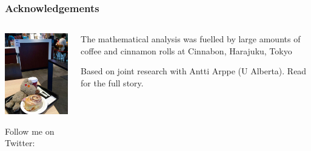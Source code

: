 \documentclass[t]{beamer} %
\begin{document}
\begin{frame}
  \frametitle{Acknowledgements}

  \ungap[1]
  \begin{columns}[T]
    \begin{column}{55mm}
      \includegraphics[width=52mm]{img/ratti_cinnamon_rolls}
      
      \scriptsize
      Follow me on Twitter: 
    \end{column}
    \begin{column}{50mm}
      The mathematical analysis was fuelled by large amounts of coffee and cinnamon rolls at Cinnabon, Harajuku, Tokyo

      \vspace{8em}
      Based on joint research with Antti Arppe (U Alberta).
      Read \citet{Evert:Arppe:15} for the full story.
    \end{column}

  \end{columns}
\end{frame}




\end{document}
